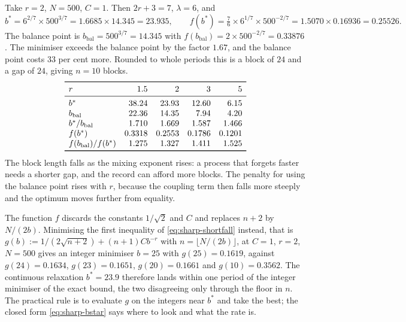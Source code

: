 \documentclass[../../../main.tex]{subfiles}
\begin{document}
\begin{example}\label{ex:sharp-bstar}
Take $r=2$, $N=500$, $C=1$. Then $2r+3=7$, $\lambda=6$, and
\[
b^*=6^{2/7}\times500^{3/7}=1.6685\times14.345=23.935,\qquad f(b^*)=\tfrac76\times6^{1/7}\times500^{-2/7}=1.5070\times0.16936=0.25526 .
\]
The balance point is $b_{\mathrm{bal}}=500^{3/7}=14.345$ with $f(b_{\mathrm{bal}})=2\times500^{-2/7}=0.33876$. The minimiser exceeds the balance point by the factor $1.67$, and the balance point costs $33$ per cent more. Rounded to whole periods this is a block of $24$ and a gap of $24$, giving $n=10$ blocks.
\[
\begin{array}{lrrrr}
\toprule
r & 1.5 & 2 & 3 & 5\\
\midrule
b^* & 38.24 & 23.93 & 12.60 & 6.15\\
b_{\mathrm{bal}} & 22.36 & 14.35 & 7.94 & 4.20\\
b^*/b_{\mathrm{bal}} & 1.710 & 1.669 & 1.587 & 1.466\\
f(b^*) & 0.3318 & 0.2553 & 0.1786 & 0.1201\\
f(b_{\mathrm{bal}})/f(b^*) & 1.275 & 1.327 & 1.411 & 1.525\\
\bottomrule
\end{array}
\]
The block length falls as the mixing exponent rises: a process that forgets faster needs a shorter gap, and the record can afford more blocks. The penalty for using the balance point rises with $r$, because the coupling term then falls more steeply and the optimum moves further from equality.
\end{example}


\begin{remark}\label{rem:sharp-exact-b}
The function $f$ discards the constants $1/\sqrt2$ and $C$ and replaces $n+2$ by $N/(2b)$. Minimising the first inequality of \eqref{eq:sharp-shortfall} instead, that is $g(b):=1/(2\sqrt{n+2})+(n+1)Cb^{-r}$ with $n=\lfloor N/(2b)\rfloor$, at $C=1$, $r=2$, $N=500$ gives an integer minimiser $b=25$ with $g(25)=0.1619$, against $g(24)=0.1634$, $g(23)=0.1651$, $g(20)=0.1661$ and $g(10)=0.3562$. The continuous relaxation $b^*=23.9$ therefore lands within one period of the integer minimiser of the exact bound, the two disagreeing only through the floor in $n$. The practical rule is to evaluate $g$ on the integers near $b^*$ and take the best; the closed form \eqref{eq:sharp-bstar} says where to look and what the rate is.
\end{remark}
\end{document}
